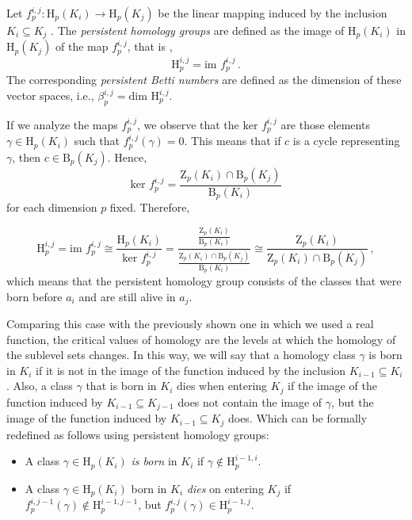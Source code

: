 \documentclass[../main.tex]{subfiles}
\begin{document}
\begin{definition}
Let ${f_{p}^{i,j}: \text{H}_p(K_i) \to \text{H}_p(K_j)}$ be the linear mapping induced by the inclusion $K_i \subseteq K_j$ . The \emph{persistent homology groups} are defined as the image of $\text{H}_p(K_i)$ in $\text{H}_p(K_j)$ of the map $f_{p}^{i,j}$, that is ,
\[
\text{H}_{p}^{i,j} = \text{im } f_{p}^{i,j}\,.
\]
The corresponding \emph{persistent Betti numbers} are defined as the dimension of these vector spaces, i.e., $\beta_{p}^{i,j} = \text{dim } \text{H}_{p}^{i,j}$.
\end{definition}

\begin{remark}
If we analyze the maps $f_{p}^{i,j}$, we observe that the $\text{ker } f_{p}^{i,j}$ are those elements $\gamma \in \text{H} _p(K_i)$ such that $f_{p}^{i,j}(\gamma)=0$. This means that if $c$ is a cycle representing $\gamma$, then $c \in \text{B}_p(K_j)$. Hence,
\[
\text{ker } f_{p}^{i,j} = \frac{\text{Z}_p(K_i) \cap \text{B}_p(K_j)}{\text{B}_p(K_i)}
\]
for each dimension $p$ fixed. Therefore,

\[
\text{H}_p^{i,j} = \text{im }f_p^{i,j} \cong \frac{\text{H}_p(K_i)}{\text{ker } f_p^{i,j}} = \frac{\frac{\text{Z}_p(K_i)}{\text{B}_p(K_i)}}{\frac{\text{Z}_p(K_i) \cap \text{B}_p(K_j)}{\text{B}_p(K_i)}} \cong \frac{\text{Z}_p(K_i)}{\text{Z}_p(K_i) \cap \text{B}_p(K_j)}\,,
\]
which means that the persistent homology group consists of the classes that were born before $a_i$ and are still alive in $a_j$.
\end{remark}

Comparing this case with the previously shown one in which we used a real function, the critical values of homology are the levels at which the homology of the sublevel sets changes. In this way, we will say that a homology class $\gamma$ is born in $K_i$ if it is not in the image of the function induced by the inclusion $K_{i-1} \subseteq K_i$. Also, a class $\gamma$ that is born in $K_i$ dies when entering $K_j$ if the image of the function induced by $K_{i-1} \subseteq K_{j-1}$ does not contain the image of $\gamma$, but the image of the function induced by $K_{i-1} \subseteq K_j$ does. Which can be formally redefined as follows using persistent homology groups:

\begin{itemize}
\item A class $\gamma \in \text{H}_p(K_i)$ \emph{is born} in $K_i$ if $\gamma \notin \text{H}_p^{i-1, i}$.
\item \begin{sloppypar}A class $\gamma \in \text{H}_p(K_i)$ born in $K_i$ \emph{dies} on entering $K_j$ if ${f_{p}^{i,j-1}( \gamma)\notin \text{H}_p^{i-1, j-1}}$, but $f_p^{i,j}(\gamma)\in \text{H}_p^{i-1, j}$.\end{sloppypar}
\end{itemize}
\end{document}
